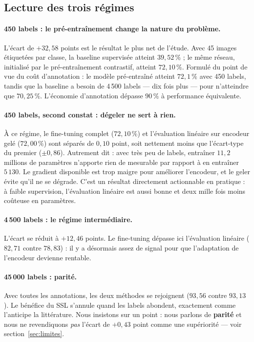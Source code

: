 \documentclass[11pt,a4paper]{article}
\begin{document}
\subsection{Lecture des trois régimes}

\paragraph{450 labels : le pré-entraînement change la nature du problème.} L'écart de
$+32{,}58$ points est le résultat le plus net de l'étude. Avec 45 images étiquetées par
classe, la baseline supervisée atteint $39{,}52\,\%$ ; le même réseau, initialisé par le
pré-entraînement contrastif, atteint $72{,}10\,\%$. Formulé du point de vue du coût
d'annotation : le modèle pré-entraîné atteint $72{,}1\,\%$ avec 450 labels, tandis que la
baseline a besoin de 4\,500 labels --- dix fois plus --- pour n'atteindre que $70{,}25\,\%$.
L'économie d'annotation dépasse $90\,\%$ à performance équivalente.

\paragraph{450 labels, second constat : dégeler ne sert à rien.} À ce régime, le fine-tuning
complet ($72{,}10\,\%$) et l'évaluation linéaire sur encodeur gelé ($72{,}00\,\%$) sont
séparés de $0{,}10$ point, soit nettement moins que l'écart-type du premier ($\pm 0{,}86$).
Autrement dit : avec très peu de labels, entraîner $11{,}2$ millions de paramètres n'apporte
rien de mesurable par rapport à en entraîner $5\,130$. Le gradient disponible est trop
maigre pour améliorer l'encodeur, et le geler évite qu'il ne se dégrade. C'est un résultat
directement actionnable en pratique : à faible supervision, l'évaluation linéaire est aussi
bonne et deux mille fois moins coûteuse en paramètres.

\paragraph{4\,500 labels : le régime intermédiaire.} L'écart se réduit à $+12{,}46$ points.
Le fine-tuning dépasse ici l'évaluation linéaire ($82{,}71$ contre $78{,}83$) : il y a
désormais assez de signal pour que l'adaptation de l'encodeur devienne rentable.

\paragraph{45\,000 labels : parité.} Avec toutes les annotations, les deux méthodes se
rejoignent ($93{,}56$ contre $93{,}13$). Le bénéfice du SSL s'annule quand les labels
abondent, exactement comme l'anticipe la littérature. Nous insistons sur un point : nous
parlons de \textbf{parité} et nous ne revendiquons \emph{pas} l'écart de $+0{,}43$ point
comme une supériorité --- voir section~\ref{sec:limites}.
\end{document}
